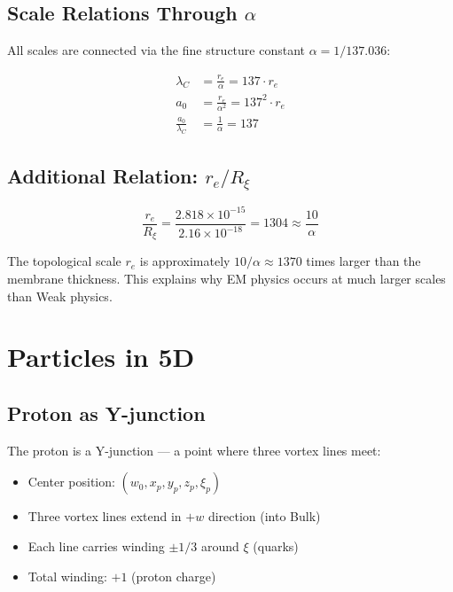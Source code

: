 \documentclass[12pt,a4paper]{article}
\begin{document}
\subsection{Scale Relations Through $\alpha$}

All scales are connected via the fine structure constant $\alpha = 1/137.036$:

\begin{keyresult}
\begin{align}
\lambda_C &= \frac{r_e}{\alpha} = 137 \cdot r_e \\[0.3cm]
a_0 &= \frac{r_e}{\alpha^2} = 137^2 \cdot r_e \\[0.3cm]
\frac{a_0}{\lambda_C} &= \frac{1}{\alpha} = 137
\end{align}
\end{keyresult}

\subsection{Additional Relation: $r_e / R_\xi$}

\begin{equation}
\frac{r_e}{R_\xi} = \frac{2.818 \times 10^{-15}}{2.16 \times 10^{-18}} = 1304 \approx \frac{10}{\alpha}
\end{equation}

\begin{physicalinsight}
The topological scale $r_e$ is approximately $10/\alpha \approx 1370$ times larger than the membrane thickness.
This explains why EM physics occurs at much larger scales than Weak physics.
\end{physicalinsight}

\section{Particles in 5D}

\subsection{Proton as Y-junction}

The proton is a Y-junction --- a point where three vortex lines meet:

\begin{itemize}
    \item Center position: $(w_0, x_p, y_p, z_p, \xi_p)$
    \item Three vortex lines extend in $+w$ direction (into Bulk)
    \item Each line carries winding $\pm 1/3$ around $\xi$ (quarks)
    \item Total winding: $+1$ (proton charge)
\end{itemize}
\end{document}
